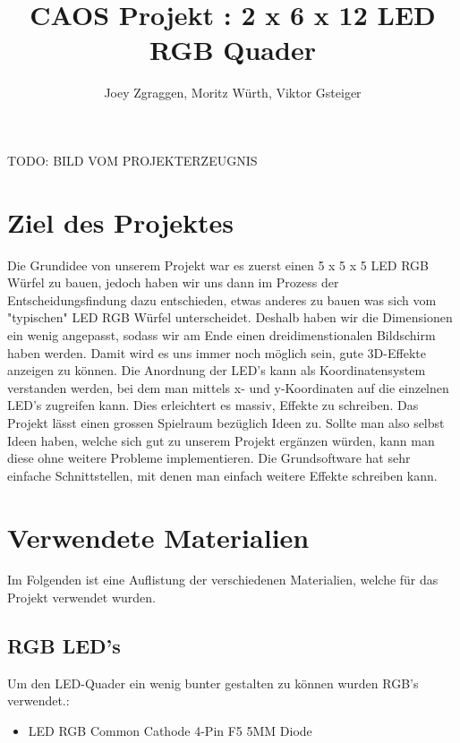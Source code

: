 \documentclass[12pt,a4paper]{article}
\title{\textbf{CAOS Projekt : 2 x 6 x 12 LED RGB Quader}}
\author{Joey Zgraggen, Moritz Würth, Viktor Gsteiger}
\begin{document}
\renewcommand\contentsname{Inhaltsverzeichnis}
\begin{titlepage}
\maketitle
TODO: BILD VOM PROJEKTERZEUGNIS
\end{titlepage}
\tableofcontents
\newpage

\section{Ziel des Projektes}

Die Grundidee von unserem Projekt war es zuerst einen 5 x 5 x 5 LED RGB Würfel zu bauen, jedoch haben wir uns dann im Prozess der Entscheidungsfindung
dazu entschieden, etwas anderes zu bauen was sich vom "typischen" LED RGB Würfel unterscheidet.
Deshalb haben wir die Dimensionen ein wenig angepasst, sodass wir am Ende einen dreidimenstionalen Bildschirm haben werden. Damit wird es uns immer noch möglich sein, gute 3D-Effekte
anzeigen zu können. Die Anordnung der LED's kann als Koordinatensystem verstanden werden, bei dem man mittels x- und y-Koordinaten auf die einzelnen LED's zugreifen kann. Dies erleichtert es massiv, Effekte zu schreiben. 
Das Projekt lässt einen grossen Spielraum bezüglich Ideen zu. Sollte man also selbst Ideen haben, welche sich gut zu unserem Projekt ergänzen würden, kann man diese ohne weitere
Probleme implementieren. Die Grundsoftware hat sehr einfache Schnittstellen, mit denen man einfach weitere Effekte schreiben kann.


\section{Verwendete Materialien}

Im Folgenden ist eine Auflistung der verschiedenen Materialien, welche für das Projekt verwendet wurden.

\subsection{RGB LED's}

Um den LED-Quader ein wenig bunter gestalten zu können wurden RGB's verwendet.:

\begin{itemize}
    \item LED RGB Common Cathode 4-Pin F5 5MM Diode
\end{itemize}
\end{document}
